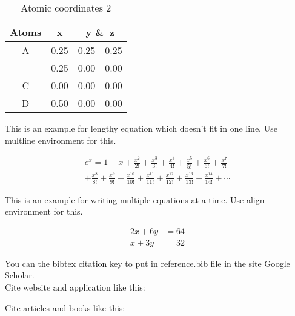 \begin{table}[H]
	\centering
\begin{tabular}{|c|c|c|c|}
	\hline
	Atoms & x & \multicolumn{2}{c|}{y \&\ z}\\
	\hline
	A  & 0.25 & 0.25 & 0.25\\
	\cline{2-4} %
	{} & 0.25 & 0.00 & 0.00\\ %
	\hline
	C  & 0.00 & 0.00 & 0.00\\
	\hline
	D  & 0.50 & 0.00 & 0.00\\
	\hline
\end{tabular}
	\caption[Atomic coordinates 2]{Atomic coordinates 2}
\end{table}


This is an example for lengthy equation which doesn't fit in one line.
Use multline environment for this.

\begin{multline}
	e^x = 1+x+\frac{x^2}{2!}+\frac{x^3}{3!}+\frac{x^4}{4!}+\frac{x^5}{5!}
	+\frac{x^6}{6!}+\frac{x^7}{7!}\\+\frac{x^8}{8!}+\frac{x^9}{9!}
	+\frac{x^{10}}{10!}+\frac{x^{11}}{11!}+\frac{x^{12}}{12!}
	+\frac{x^{13}}{13!}+\frac{x^{14}}{14!}+\cdots
	\label{eq:expansion}
\end{multline}

This is an example for writing multiple equations at a time.
Use align environment for this.

\begin{align}
	2x+6y&=64\\
	x+3y&=32
	\label{eq:xy}
\end{align}


You can the bibtex citation key to put in reference.bib file in the site
Google Scholar.\\

Cite website and application like this: \hspace{1cm}
\cite{williams_gnuplot_nodate}

Cite articles and books like this: \hspace{1cm}
\cite{hohenberg1964inhomogeneous}

